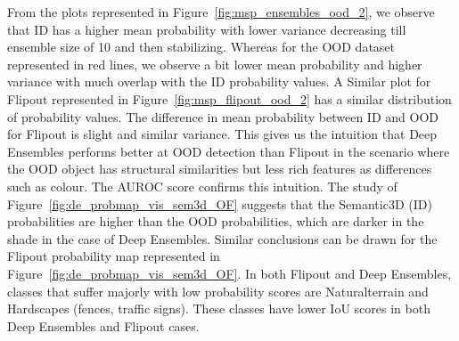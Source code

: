     From the plots represented in Figure~\ref{fig:msp_ensembles_ood_2}, we observe that ID has a higher mean probability with lower variance decreasing till ensemble size of 10 and then stabilizing.
    Whereas for the OOD dataset represented in red lines, we observe a bit lower mean probability and higher variance with much overlap with the ID probability values.
    A Similar plot for Flipout represented in Figure~\ref{fig:msp_flipout_ood_2} has a similar distribution of probability values.
    The difference in mean probability between ID and OOD for Flipout is slight and similar variance.
    This gives us the intuition that Deep Ensembles performs better at OOD detection than Flipout in the scenario where the OOD object has structural similarities but less rich features as differences such as colour. The AUROC score confirms this intuition.
    The study of Figure~\ref{fig:de_probmap_vis_sem3d_OF} suggests that the Semantic3D (ID) probabilities are higher than the OOD probabilities, which are darker in the shade in the case of Deep Ensembles.
    Similar conclusions can be drawn for the Flipout probability map represented in Figure~\ref{fig:de_probmap_vis_sem3d_OF}.
    In both Flipout and Deep Ensembles, classes that suffer majorly with low probability scores are Naturalterrain and Hardscapes (fences, traffic signs). These classes have lower IoU scores in both Deep Ensembles and Flipout cases.
